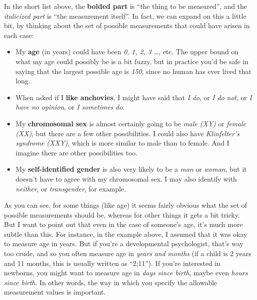 \documentclass[
]{book}
\begin{document}
In the short list above, the {\textbf{bolded part}} is ``the thing to be measured'', and the {\emph{italicized part}} is ``the measurement itself''. In fact, we can expand on this a little bit, by thinking about the set of possible measurements that could have arisen in each case:

\begin{itemize}
\item
  My {\textbf{age}} (in years) could have been {\emph{0, 1, 2, 3 \ldots{}}}, etc. The upper bound on what my age could possibly be is a bit fuzzy, but in practice you'd be safe in saying that the largest possible age is {\emph{150}}, since no human has ever lived that long.
\item
  When asked if I {\textbf{like anchovies}}, I might have said that {\emph{I do}}, or {\emph{I do not}}, or {\emph{I have no opinion}}, or {\emph{I sometimes do}}.
\item
  My {\textbf{chromosomal sex}} is almost certainly going to be {\emph{male (XY)}} or {\emph{female (XX)}}, but there are a few other possibilities. I could also have {\emph{Klinfelter's syndrome (XXY)}}, which is more similar to male than to female. And I imagine there are other possibilities too.
\item
  My {\textbf{self-identified gender}} is also very likely to be a {\emph{man}} or {\emph{woman}}, but it doesn't have to agree with my chromosomal sex. I may also identify with {\emph{neither}}, or {\emph{transgender}}, for example.
\end{itemize}

As you can see, for some things (like age) it seems fairly obvious what the set of possible measurements should be, whereas for other things it gets a bit tricky. But I want to point out that even in the case of someone's age, it's much more subtle than this. For instance, in the example above, I assumed that it was okay to measure age in years. But if you're a developmental psychologist, that's way too crude, and so you often measure age in {\emph{years and months}} (if a child is 2 years and 11 months, this is usually written as ``2;11''). If you're interested in newborns, you might want to measure age in {\emph{days since birth}}, maybe even {\emph{hours since birth}}. In other words, the way in which you specify the allowable measurement values is important.
\end{document}
